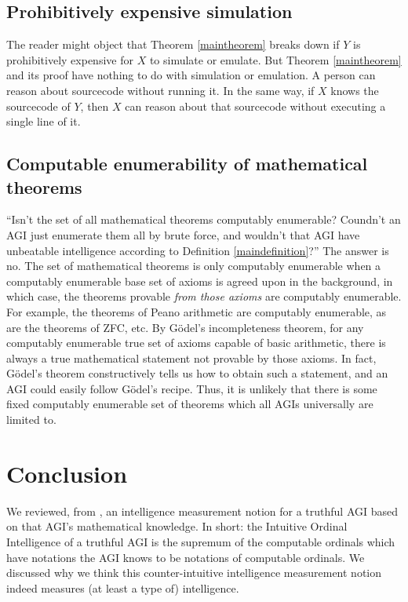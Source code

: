 \documentclass[runningheads]{llncs}
\begin{document}
\subsection{Prohibitively expensive simulation}

The reader might object that Theorem \ref{maintheorem} breaks down if $Y$ is prohibitively
expensive for $X$ to simulate or emulate. But Theorem \ref{maintheorem} and its
proof have nothing to do with simulation or emulation. A person can reason about sourcecode
without running it. In the same way, if $X$ knows the sourcecode
of $Y$, then $X$ can reason about that sourcecode without executing a single line
of it.

\subsection{Computable enumerability of mathematical theorems}

``Isn't the set of all mathematical theorems computably enumerable?
Coundn't an AGI just enumerate them all by brute force, and wouldn't that AGI have
unbeatable intelligence according to Definition \ref{maindefinition}?'' The answer is no.
The set of mathematical theorems is only computably enumerable when a computably
enumerable base set of axioms is agreed upon in the background, in which case,
the theorems provable \emph{from those axioms} are computably enumerable.
For example, the
theorems of Peano arithmetic are computably enumerable, as are the theorems of
ZFC, etc. By G\"odel's incompleteness theorem, for any computably
enumerable true set of axioms capable of basic arithmetic, there is always a
true mathematical statement not provable by
those axioms. In fact, G\"odel's theorem constructively tells us how to obtain such a
statement, and an AGI could easily follow G\"odel's recipe.
Thus, it is unlikely that there is some fixed computably enumerable
set of theorems which all AGIs universally are limited to.

\section{Conclusion}
\label{conclusionsection}

We reviewed, from \cite{alexander2019measuring}, an intelligence measurement notion
for a truthful AGI based on that AGI's mathematical knowledge.
In short: the Intuitive Ordinal Intelligence of a truthful AGI is the supremum of the
computable ordinals which have notations the AGI knows to be notations of
computable ordinals. We discussed why we think this counter-intuitive intelligence
measurement notion indeed measures (at least a type of) intelligence.
\end{document}
